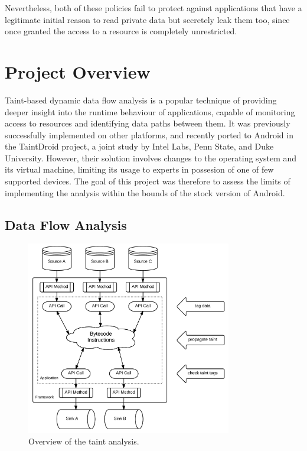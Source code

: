\documentclass[12pt,twoside,notitlepage]{report}
\begin{document}
Nevertheless, both of these policies fail to protect against applications that have a legitimate initial reason to read private data but secretely leak them too, since once granted the access to a resource is completely unrestricted.

\section{Project Overview}

Taint-based dynamic data flow analysis is a popular technique of providing deeper insight into the runtime behaviour of applications, capable of monitoring access to resources and identifying data paths between them. It was previously successfully implemented on other platforms\cite{Zhu:2011:TPS:1945023.1945039}, and recently ported to Android in the TaintDroid project\cite{web:TaintDroid, Enck:2010:TIT:1924943.1924971}, a joint study by Intel Labs, Penn State, and Duke University. However, their solution involves changes to the operating system and its virtual machine, limiting its usage to experts in possesion of one of few supported devices. The goal of this project was therefore to assess the limits of implementing the analysis within the bounds of the stock version of Android.

\subsection{Data Flow Analysis}

\begin{figure}
	\centerline{	
		\includegraphics[width=0.8\textwidth]{figs/fig_intro_tainting.png}
	}
	\caption{Overview of the taint analysis.}
	\label{fig:Introduction_TaintingOverview}
\end{figure}
\end{document}
